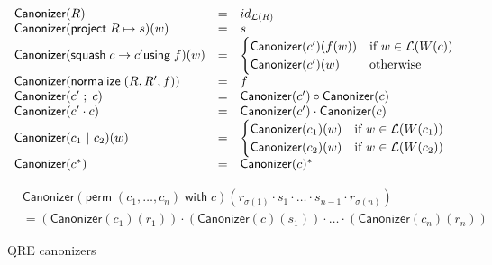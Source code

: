 \documentclass[acmsmall,review,anonymous]{acmart}
\newcommand{\kw}[1]{\ensuremath{\mathsf{#1}}}
\newcommand{\project}[2]{\ensuremath{\kw{project} \; #1 \mapsto #2}}
\newcommand{\squash}[3]{\ensuremath{\kw{squash} \; #1 \rightarrow #2
\kw{using} \; #3}}
\newcommand{\perm}[2]{\ensuremath{\kw{perm}\; (#1)\; \kw{with}\; #2}}
\newcommand{\normalize}[3]{\ensuremath{\kw{normalize} \; (#1, #2, #3)}}
\newcommand{\sep}{\ensuremath{\ | \ }}
\newcommand{\canonizer}{\ensuremath{\kw{Canonizer}}}
\begin{document}
\begin{figure}[t]
\begin{center}
\[
\begin{array}{l@\quad l @\quad l}
\canonizer(R) &=& id_{\mathcal{L}(R)} \\
\canonizer(\project{R}{s})(w) &=& s\\
\canonizer(\squash{c}{c'}{f})(w) &=&
\begin{cases}
\canonizer(c')(f(w)) & \text{if } w \in \mathcal{L}(W(c))\\
\canonizer(c')(w) & \text{otherwise}
\end{cases}\\
\canonizer(\normalize{R}{R'}{f}) &=& f\\
\canonizer(c' \; ; \; c) &=& \canonizer(c') \circ \canonizer(c)\\
\canonizer(c' \cdot c) &=& \canonizer(c') \cdot \canonizer(c)\\
\canonizer(c_1 \sep c_2)(w) &=&
\begin{cases}
\canonizer(c_1)(w) & \text{if } w \in \mathcal{L}(W(c_1))\\
\canonizer(c_2)(w) & \text{if } w \in \mathcal{L}(W(c_2))\\
\end{cases}\\
\canonizer(c^*) &=& \canonizer(c)^* \\
\end{array}
\]
\end{center}
\begin{align*}
&\canonizer(\perm{c_1, \ldots, c_n}{c})(r_{\sigma(1)}
\cdot s_1 \cdot \ldots \cdot s_{n-1} \cdot r_{\sigma(n)})\\
&= (\canonizer(c_1)(r_1)) \cdot (\canonizer(c)(s_1)) \cdot \ldots \cdot
(\canonizer(c_n)(r_n))
\end{align*}
\caption{QRE canonizers}
\label{fig:canonizers}
\end{figure}
\end{document}
